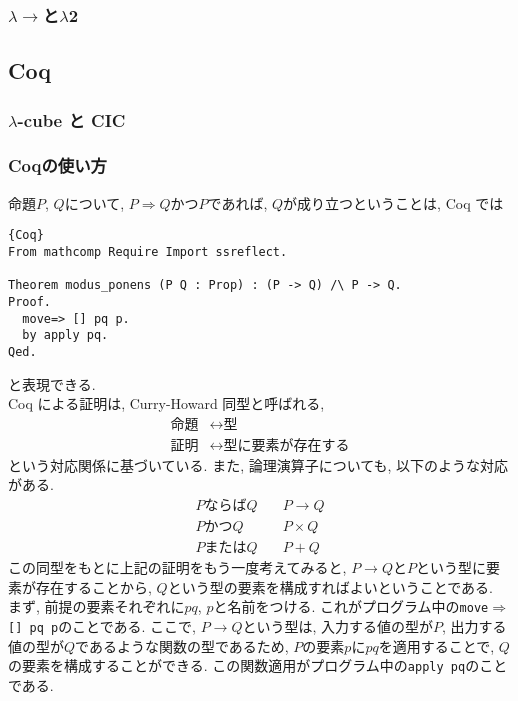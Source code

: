 \documentclass[11pt]{jarticle}
\theoremstyle{mystyle}
\newcommand{\Lra}{\Longrightarrow}
\newcommand{\ra}{\rightarrow}
\newcommand{\0}{\textbf{0}}
\newcommand{\1}{\textbf{1}}
\newcommand{\2}{\textbf{2}}
\newcommand{\lama}{\lambda \! \! \to}
\begin{document}
\subsubsection{$\lama$と$\lambda$2}
\subsection{Coq} \label{ssec Coq}
\subsubsection{$\lambda$-cube と CIC}
\subsubsection{Coqの使い方} \label{sssec coq_use}

命題$P$, $Q$について, $P \Lra Q$かつ$P$であれば, $Q$が成り立つということは, Coq では
\begin{lstlisting}{Coq}
From mathcomp Require Import ssreflect.

Theorem modus_ponens (P Q : Prop) : (P -> Q) /\ P -> Q.
Proof.
  move=> [] pq p.
  by apply pq.
Qed.
\end{lstlisting}
と表現できる. \\
Coq による証明は, Curry-Howard 同型と呼ばれる, 
\begin{align*}
  \text{命題} &\leftrightarrow \text{型} \\
  \text{証明} &\leftrightarrow \text{型に要素が存在する}
\end{align*}
という対応関係に基づいている. また, 論理演算子についても, 以下のような対応がある. 
\begin{align*}
  P \text{ならば} Q &\quad P \rightarrow Q \\
  P \text{かつ} Q &\quad P \times Q \\
  P \text{または} Q &\quad  P + Q
\end{align*}
この同型をもとに上記の証明をもう一度考えてみると, $P \ra Q$と$P$という型に要素が存在することから, $Q$という型の要素を構成すればよいということである. \\
まず, 前提の要素それぞれに$pq$, $p$と名前をつける. これがプログラム中の{\tt move$\Rightarrow$ [] pq p}のことである. 
ここで, $P \to Q$という型は, 入力する値の型が$P$, 出力する値の型が$Q$であるような関数の型であるため, $P$の要素$p$に$pq$を適用することで, $Q$の要素を構成することができる. この関数適用がプログラム中の{\tt apply pq}のことである. 
\end{document}
